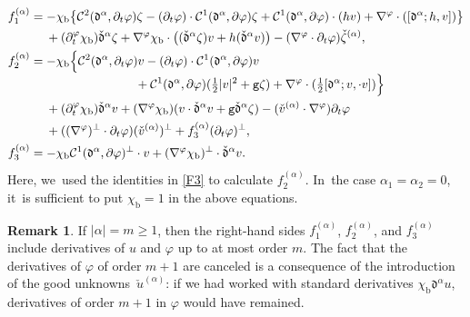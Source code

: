 \documentclass[10pt]{amsart}
\newcommand{\gr}{{\mathtt g}}
\newcommand{\dt}{\partial_t}
\newcommand{\cmfalpha}{\check{\mathfrak{d}}^{\alpha}}
\theoremstyle{definition}
\newtheorem{remark}[theorem]{Remark}
\begin{document}
\begin{align*}
f_1^{(\alpha)}
&= - \chi_\mathrm{b}\bigl\{ {\mathcal C}^2(\mathfrak{d}^\alpha,\dt \varphi)\zeta
- (\dt\varphi)\cdot {\mathcal C}^1(\mathfrak{d}^\alpha,\partial\varphi)\zeta
+ {\mathcal C}^1(\mathfrak{d}^\alpha,\partial\varphi)\cdot(hv)
+ \nabla^\varphi\cdot([\mathfrak{d}^\alpha;h,v]) \bigr\} \\
&\quad\;
+ (\dt^\varphi\chi_\mathrm{b}) \cmfalpha \zeta
+ \nabla^\varphi\chi_\mathrm{b}\cdot\bigl((\cmfalpha \zeta)v + h (\cmfalpha v) \bigr)
- (\nabla^\varphi\cdot\dt\varphi)\check{\zeta}^{(\alpha)}, \\
f_2^{(\alpha)}
&= -\chi_\mathrm{b}\Bigl\{ {\mathcal C}^2(\mathfrak{d}^\alpha,\dt \varphi) v
- (\dt\varphi)\cdot {\mathcal C}^1(\mathfrak{d}^\alpha,\partial\varphi)v\\[-3pt]
&\hspace*{3cm}+ {\mathcal C}^1(\mathfrak{d}^\alpha,\partial\varphi) (\tfrac12|v|^2+\gr\zeta)
+ \nabla^\varphi\cdot(\tfrac12[\mathfrak{d}^\alpha;v,\cdot v]) \Bigr\}\\
&\quad\;+ (\dt^\varphi\chi_\mathrm{b}) \cmfalpha v
+ (\nabla^\varphi\chi_\mathrm{b})(v\cdot\cmfalpha v + \gr\cmfalpha\zeta)- (\check{v}^{(\alpha)}\cdot\nabla^\varphi)\dt\varphi  \\
&\quad\;
+ ((\nabla^\varphi)^\perp\cdot\dt\varphi)(\check{v}^{(\alpha)})^\perp
+ f_3^{(\alpha)}(\dt\varphi)^\perp, \\
f_3^{(\alpha)}
&= -\chi_\mathrm{b} {\mathcal C}^1(\mathfrak{d}^\alpha,\partial\varphi)^\perp \cdot v
+ (\nabla^\varphi\chi_\mathrm{b})^\perp\cdot \cmfalpha v.
\end{align*}
Here, we~used the identities in \eqref{F3} to calculate $f_2^{(\alpha)}$. In~the case $\alpha_1=\alpha_2=0$, it~is sufficient to put $\chi_\mathrm{b}=1$ in the above equations.

\begin{remark}\label{re:GU1}
If $|\alpha|=m\geq1$, then the right-hand sides $f_1^{(\alpha)}$, $f_2^{(\alpha)}$, and $f_3^{(\alpha)}$ include derivatives of $u$ and $\varphi$
up to at most order $m$.
The fact that the derivatives of $\varphi$ of order $m+1$ are canceled is a consequence of the introduction of the good unknowns~$\check{u}^{(\alpha)}$:
if we had worked with standard derivatives $\chi_\mathrm{b}\mathfrak{d}^\alpha u$, derivatives of order $m+1$ in $\varphi$ would have remained.
\end{remark}
\end{document}
